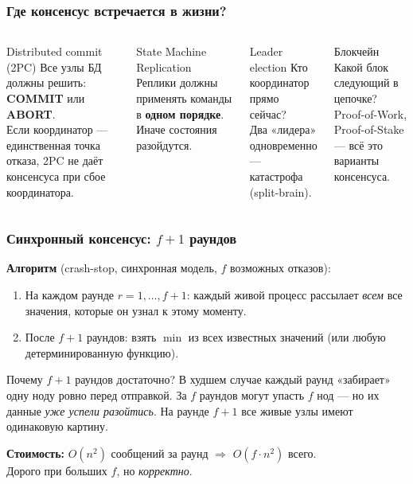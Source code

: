 \documentclass{beamer}
\begin{document}
\begin{frame}
\frametitle{Где консенсус встречается в жизни?}

\begin{columns}[T]
\begin{block}{Distributed commit (2PC)}
  Все узлы БД должны решить: \textbf{COMMIT} или \textbf{ABORT}.\\
  \small Если координатор --- единственная точка отказа, 2PC не даёт консенсуса при сбое координатора.
\end{block}
\vspace{0.3em}
\begin{block}{State Machine Replication}
  Реплики должны применять команды в \textbf{одном порядке}.\\
  \small Иначе состояния разойдутся.
\end{block}

\begin{block}{Leader election}
  Кто координатор прямо сейчас?\\
  \small Два «лидера» одновременно --- катастрофа (split-brain).
\end{block}
\vspace{0.3em}
\begin{block}{Блокчейн}
  Какой блок следующий в цепочке?\\
  \small Proof-of-Work, Proof-of-Stake --- всё это варианты консенсуса.
\end{block}
\end{columns}

\end{frame}

\begin{frame}
\frametitle{Синхронный консенсус: \texorpdfstring{$f{+}1$}{f+1} раундов}

\textbf{Алгоритм} (crash-stop, синхронная модель, $f$ возможных отказов):

\begin{enumerate}
  \item На каждом раунде $r = 1,\ldots,f{+}1$: каждый живой процесс рассылает \emph{всем} все значения, которые он узнал к этому моменту.
  \item После $f{+}1$ раундов: взять $\min$ из всех известных значений (или любую детерминированную функцию).
\end{enumerate}

\vspace{0.2em}
\begin{exampleblock}{Почему $f{+}1$ раундов достаточно?}
В худшем случае каждый раунд «забирает» одну ноду ровно перед отправкой.
За $f$ раундов могут упасть $f$ нод --- но их данные \emph{уже успели разойтись}.
На раунде $f{+}1$ все живые узлы имеют одинаковую картину.
\end{exampleblock}

\vspace{0.2em}
\textbf{Стоимость:} $O(n^2)$ сообщений за раунд $\Rightarrow$ $O(f \cdot n^2)$ всего.\\
\small Дорого при больших $f$, но \emph{корректно}.

\end{frame}
\end{document}
